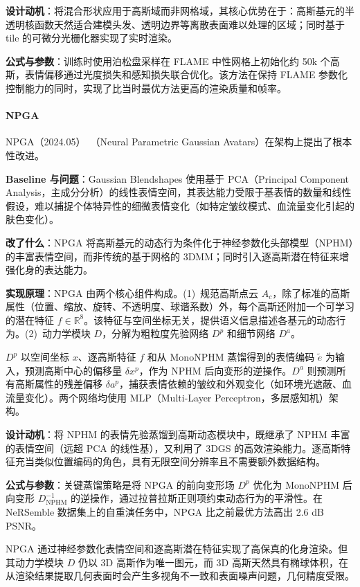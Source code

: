\textbf{设计动机}：将混合形状应用于高斯域而非网格域，其核心优势在于：高斯基元的半透明核函数天然适合建模头发、透明边界等离散表面难以处理的区域；同时基于 tile 的可微分光栅化器实现了实时渲染。

\textbf{公式与参数}：训练时使用泊松盘采样在 FLAME 中性网格上初始化约 50k 个高斯，表情偏移通过光度损失和感知损失联合优化。该方法在保持 FLAME 参数化控制能力的同时，实现了比当时最优方法更高的渲染质量和帧率。

\paragraph{NPGA}

NPGA（2024.05）~\cite{2405_19331}（Neural Parametric Gaussian Avatars）在架构上提出了根本性改进。

\textbf{Baseline 与问题}：Gaussian Blendshapes 使用基于 PCA（Principal Component Analysis，主成分分析）的线性表情空间，其表达能力受限于基表情的数量和线性假设，难以捕捉个体特异性的细微表情变化（如特定皱纹模式、血流量变化引起的肤色变化）。

\textbf{改了什么}：NPGA 将高斯基元的动态行为条件化于神经参数化头部模型（NPHM）的丰富表情空间，而非传统的基于网格的 3DMM；同时引入逐高斯潜在特征来增强化身的表达能力。

\textbf{实现原理}：NPGA 由两个核心组件构成。(1)~规范高斯点云 $A_c$，除了标准的高斯属性（位置、缩放、旋转、不透明度、球谐系数）外，每个高斯还附加一个可学习的潜在特征 $f \in \mathbb{R}^8$。该特征与空间坐标无关，提供语义信息描述各基元的动态行为。(2)~动力学模块 $D$，分解为粗粒度先验网络 $D^p$ 和细节网络 $D^a$。

$D^p$ 以空间坐标 $x$、逐高斯特征 $f$ 和从 MonoNPHM 蒸馏得到的表情编码 $\tilde{e}$ 为输入，预测高斯中心的偏移量 $\delta x^p$，作为 NPHM 后向变形的逆操作。$D^a$ 则预测所有高斯属性的残差偏移 $\delta a^p$，捕获表情依赖的皱纹和外观变化（如环境光遮蔽、血流量变化）。两个网络均使用 MLP（Multi-Layer Perceptron，多层感知机）架构。

\textbf{设计动机}：将 NPHM 的表情先验蒸馏到高斯动态模块中，既继承了 NPHM 丰富的表情空间（远超 PCA 的线性基），又利用了 3DGS 的高效渲染能力。逐高斯特征充当类似位置编码的角色，具有无限空间分辨率且不需要额外数据结构。

\textbf{公式与参数}：关键蒸馏策略是将 NPGA 的前向变形场 $D^p$ 优化为 MonoNPHM 后向变形 $D^{-1}_{\text{NPHM}}$ 的逆操作，通过拉普拉斯正则项约束动态行为的平滑性。在 NeRSemble 数据集上的自重演任务中，NPGA 比之前最优方法高出 2.6 dB PSNR。

NPGA 通过神经参数化表情空间和逐高斯潜在特征实现了高保真的化身渲染。但其动力学模块 $D$ 仍以 3D 高斯作为唯一图元，而 3D 高斯天然具有椭球体积，在从渲染结果提取几何表面时会产生多视角不一致和表面噪声问题，几何精度受限。

